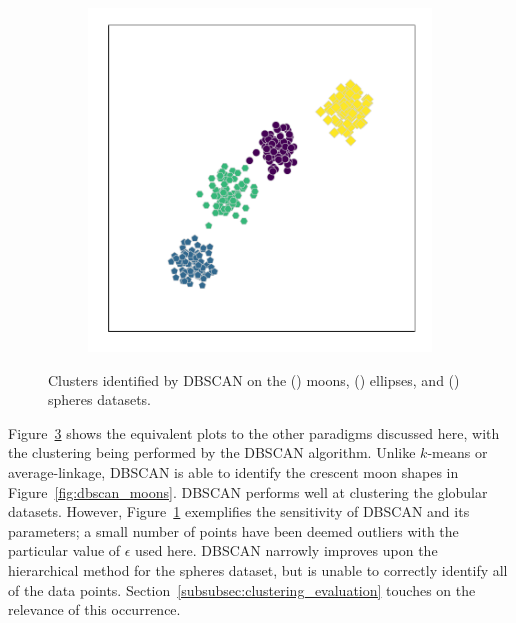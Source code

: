 \begin{figure}
\begin{subfigure}{.333\textwidth}
        \caption{}\label{fig:dbscan_ellipses}
    \end{subfigure}%
    \hfill%
    \begin{subfigure}{.333\textwidth}
        \includegraphics[width=\linewidth]{dbscan/spheres}
        \caption{}\label{fig:dbscan_spheres}
    \end{subfigure}
    \caption{%
        Clusters identified by DBSCAN on the () moons,
        () ellipses, and
        () spheres datasets.%
    }\label{fig:dbscan_examples}
\end{figure}

Figure~\ref{fig:dbscan_examples} shows the equivalent plots to the other
paradigms discussed here, with the clustering being performed by the DBSCAN
algorithm. Unlike \(k\)-means or average-linkage, DBSCAN is able to identify the
crescent moon shapes in Figure~\ref{fig:dbscan_moons}. DBSCAN performs well at
clustering the globular datasets. However, Figure~\ref{fig:dbscan_ellipses}
exemplifies the sensitivity of DBSCAN and its parameters; a small number of
points have been deemed outliers with the particular value of \(\epsilon\) used
here. DBSCAN narrowly improves upon the hierarchical method for the spheres
dataset, but is unable to correctly identify all of the data points.
Section~\ref{subsubsec:clustering_evaluation} touches on the relevance of this
occurrence.

